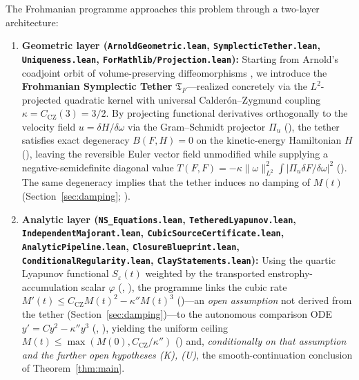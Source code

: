 \documentclass[11pt,a4paper]{article}
\theoremstyle{plain}
\theoremstyle{definition}
\theoremstyle{remark}
\newcommand{\Tf}{\mathfrak{T}_F}
\newcommand{\CZ}{C_{\mathrm{CZ}}}
\begin{document}
The Frohmanian programme approaches this problem through a two-layer architecture:
\begin{enumerate}
\item \textbf{Geometric layer (\texttt{ArnoldGeometric.lean}, \texttt{SymplecticTether.lean}, \texttt{Uniqueness.lean}, \texttt{ForMathlib/Projection.lean}):} Starting from Arnold's coadjoint orbit of volume-preserving diffeomorphisms \cite{Arnold1966,ArnoldKhesin1998}, we introduce the \textbf{Frohmanian Symplectic Tether} $\Tf$—realized concretely via the $L^2$-projected quadratic kernel  with universal Calderón--Zygmund coupling $\kappa=\CZ(3)=3/2$. By projecting functional derivatives orthogonally to the velocity field $u=\delta H/\delta\omega$ via the Gram--Schmidt projector $\Pi_u$ (), the tether satisfies exact degeneracy $B(F,H)=0$ on the kinetic-energy Hamiltonian $H$ (), leaving the reversible Euler vector field unmodified while supplying a negative-semidefinite diagonal value $T(F,F)=-\kappa\|\omega\|_{L^2}^2\int|\Pi_u\delta F/\delta\omega|^2$ (). The same degeneracy implies that the tether induces no damping of $M(t)$ (Section~\ref{sec:damping}; ).
\item \textbf{Analytic layer (\texttt{NS\_Equations.lean}, \texttt{TetheredLyapunov.lean}, \texttt{IndependentMajorant.lean}, \texttt{CubicSourceCertificate.lean}, \texttt{AnalyticPipeline.lean}, \texttt{ClosureBlueprint.lean}, \texttt{ConditionalRegularity.lean}, \texttt{ClayStatements.lean}):} Using the quartic Lyapunov functional $S_\varepsilon(t)$ weighted by the transported enstrophy-accumulation scalar $\varphi$ (, ), the programme links the cubic rate $M'(t)\le \CZ M(t)^2-\kappa'' M(t)^3$ ()---an \emph{open assumption} not derived from the tether (Section~\ref{sec:damping})---to the autonomous comparison ODE $y'=Cy^2-\kappa''y^3$ (, ), yielding the uniform ceiling $M(t)\le\max(M(0),\CZ/\kappa'')$ () and, \emph{conditionally on that assumption and the further open hypotheses (K), (U)}, the smooth-continuation conclusion of Theorem~\ref{thm:main}.
\end{enumerate}
\end{document}
